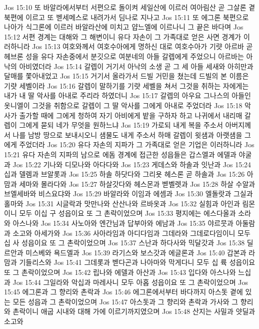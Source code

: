 Jos 15:10  또 바알라에서부터 서편으로 돌이켜 세일산에 이르러 여아림산 곧 그살론 곁 북편에 이르고 또 벧세메스로 내려가서 딤나로 지나고
Jos 15:11  또 에그론 북편으로 나아가 식그론에 이르러 바알라산에 미치고 얍느엘에 이르나니 그 끝은 바다며
Jos 15:12  서편 경계는 대해와 그 해변이니 유다 자손이 그 가족대로 얻은 사면 경계가 이러하니라
Jos 15:13  여호와께서 여호수아에게 명하신 대로 여호수아가 기럇 아르바 곧 헤브론 성을 유다 자손중에서 분깃으로 여분네의 아들 갈렙에게 주었으니 아르바는 아낙의 아비였더라
Jos 15:14  갈렙이 거기서 아낙의 소생 곧 그 세 아들 세새와 아히만과 달매를 쫓아내었고
Jos 15:15  거기서 올라가서 드빌 거민을 쳤는데 드빌의 본 이름은 기럇 세벨이라
Jos 15:16  갈렙이 말하기를 기럇 세벨을 쳐서 그것을 취하는 자에게는 내가 내 딸 악사를 아내로 주리라 하였더니
Jos 15:17  갈렙의 아우요 그나스의 아들인 옷니엘이 그것을 취함으로 갈렙이 그 딸 악사를 그에게 아내로 주었더라
Jos 15:18  악사가 출가할 때에 그에게 청하여 자기 아비에게 밭을 구하자 하고 나귀에서 내리매 갈렙이 그에게 묻되 네가 무엇을 원하느냐
Jos 15:19  가로되 내게 복을 주소서 아버지께서 나를 남방 땅으로 보내시오니 샘물도 내게 주소서 하매 갈렙이 윗샘과 아랫샘을 그에게 주었더라
Jos 15:20  유다 자손의 지파가 그 가족대로 얻은 기업은 이러하니라
Jos 15:21  유다 자손의 지파의 남으로 에돔 경계에 접근한 성읍들은 갑스엘과 에델과 야굴과
Jos 15:22  기나와 디모나와 아다다와
Jos 15:23  게데스와 하솔과 잇난과
Jos 15:24  십과 델렘과 브알롯과
Jos 15:25  하솔 하닷다와 그리욧 헤스론 곧 하솔과
Jos 15:26  아맘과 세마와 몰라다와
Jos 15:27  하살갓다와 헤스몬과 벧벨렛과
Jos 15:28  하살 수알과 브엘세바와 비스요댜와
Jos 15:29  바알라와 이임과 에셈과
Jos 15:30  엘돌랏과 그실과 홀마와
Jos 15:31  시글락과 맛만나와 산산나와 르바옷과
Jos 15:32  실힘과 아인과 림몬이니 모두 이십 구 성읍이요 또 그 촌락이었으며
Jos 15:33  평지에는 에스다올과 소라와 아스나와
Jos 15:34  사노아와 엔간님과 답부아와 에남과
Jos 15:35  야르뭇과 아둘람과 소고와 아세가와
Jos 15:36  사아라임과 아디다임과 그데라와 그데로다임이니 모두 십 사 성읍이요 또 그 촌락이었으며
Jos 15:37  스난과 하다사와 믹달갓과
Jos 15:38  딜르안과 미스베와 욕드엘과
Jos 15:39  라기스와 보스갓과 에글론과
Jos 15:40  갑본과 라맘과 기들리스와
Jos 15:41  그데롯과 벧다곤과 나아마와 막게다니 모두 십 륙 성읍이요 또 그 촌락이었으며
Jos 15:42  립나와 에델과 아산과
Jos 15:43  입다와 아스나와 느십과
Jos 15:44  그일라와 악십과 마레사니 모두 아홉 성읍이요 또 그 촌락이었으며
Jos 15:45  에그론과 그 향리와 촌락과
Jos 15:46  에그론에서부터 바다까지 아스돗 곁에 있는 모든 성읍과 그 촌락이었으며
Jos 15:47  아스돗과 그 향리와 촌락과 가사와 그 향리와 촌락이니 애굽 시내와 대해 가에 이르기까지였으며
Jos 15:48  산지는 사밀과 얏딜과 소고와
